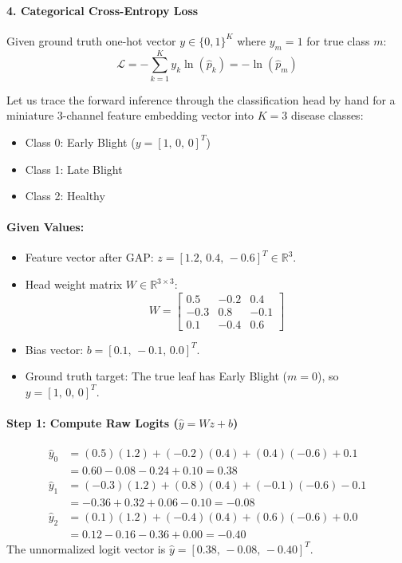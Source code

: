 \paragraph{4. Categorical Cross-Entropy Loss}
Given ground truth one-hot vector $y \in \{0, 1\}^K$ where $y_m = 1$ for true class $m$:
\begin{equation}
\mathcal{L} = -\sum_{k=1}^K y_k \ln(\hat{p}_k) = -\ln(\hat{p}_m)\label{eq:cce_formula}
\end{equation}

\begin{example}
Let us trace the forward inference through the classification head by hand for a miniature $3$-channel feature embedding vector into $K = 3$ disease classes:
\begin{itemize}
    \item Class 0: Early Blight ($y = [1,\, 0,\, 0]^T$)
    \item Class 1: Late Blight
    \item Class 2: Healthy
\end{itemize}

\paragraph{Given Values:}
\begin{itemize}
    \item Feature vector after GAP: $z = [1.2,\, 0.4,\, -0.6]^T \in \mathbb{R}^3$.
    \item Head weight matrix $W \in \mathbb{R}^{3 \times 3}$:
    \begin{equation*}
    W = \begin{bmatrix}
    0.5 & -0.2 & 0.4 \\
    -0.3 & 0.8 & -0.1 \\
    0.1 & -0.4 & 0.6
    \end{bmatrix}
    \end{equation*}
    \item Bias vector: $b = [0.1,\, -0.1,\, 0.0]^T$.
    \item Ground truth target: The true leaf has Early Blight ($m = 0$), so $y = [1,\, 0,\, 0]^T$.
\end{itemize}

\paragraph{Step 1: Compute Raw Logits ($\hat{y} = W z + b$)}
\begin{align*}
\hat{y}_0 &= (0.5)(1.2) + (-0.2)(0.4) + (0.4)(-0.6) + 0.1 \\
&= 0.60 - 0.08 - 0.24 + 0.10 = \mathbf{0.38} \\[0.4em]
\hat{y}_1 &= (-0.3)(1.2) + (0.8)(0.4) + (-0.1)(-0.6) - 0.1 \\
&= -0.36 + 0.32 + 0.06 - 0.10 = \mathbf{-0.08} \\[0.4em]
\hat{y}_2 &= (0.1)(1.2) + (-0.4)(0.4) + (0.6)(-0.6) + 0.0 \\
&= 0.12 - 0.16 - 0.36 + 0.00 = \mathbf{-0.40}
\end{align*}
The unnormalized logit vector is $\hat{y} = [0.38,\, -0.08,\, -0.40]^T$.


\end{example}
